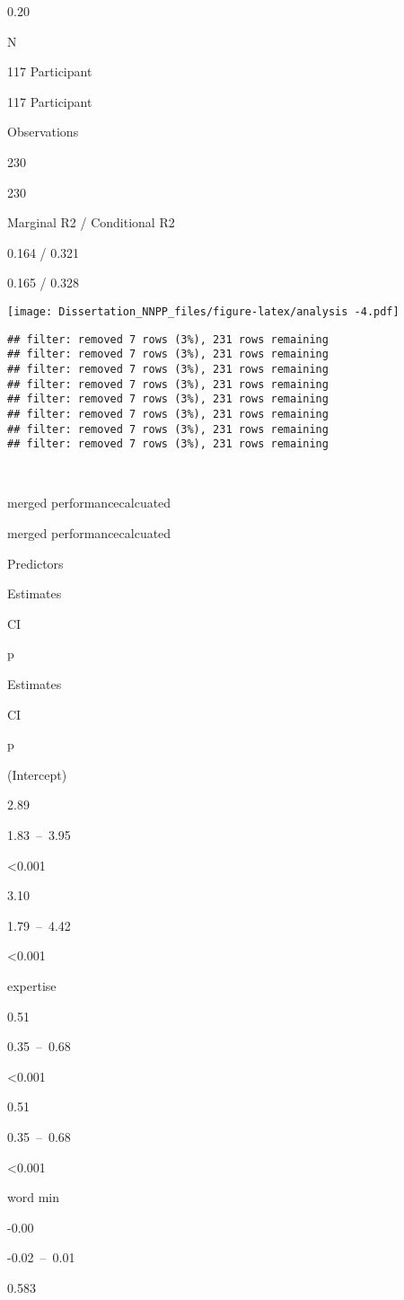 \documentclass[
]{article}
\begin{document}
0.20

N

117 Participant

117 Participant

Observations

230

230

Marginal R2 / Conditional R2

0.164 / 0.321

0.165 / 0.328

\texttt{[image: Dissertation\_NNPP\_files/figure-latex/analysis -4.pdf]}

\begin{verbatim}
## filter: removed 7 rows (3%), 231 rows remaining
## filter: removed 7 rows (3%), 231 rows remaining
## filter: removed 7 rows (3%), 231 rows remaining
## filter: removed 7 rows (3%), 231 rows remaining
## filter: removed 7 rows (3%), 231 rows remaining
## filter: removed 7 rows (3%), 231 rows remaining
## filter: removed 7 rows (3%), 231 rows remaining
## filter: removed 7 rows (3%), 231 rows remaining
\end{verbatim}

~

merged performancecalcuated

merged performancecalcuated

Predictors

Estimates

CI

p

Estimates

CI

p

(Intercept)

2.89

1.83~--~3.95

\textless0.001

3.10

1.79~--~4.42

\textless0.001

expertise

0.51

0.35~--~0.68

\textless0.001

0.51

0.35~--~0.68

\textless0.001

word min

-0.00

-0.02~--~0.01

0.583
\end{document}
